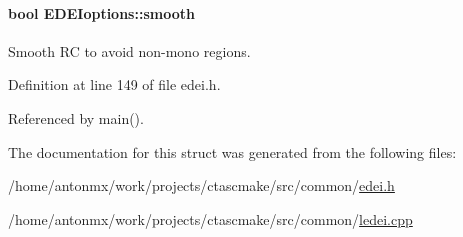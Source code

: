 \hypertarget{structEDEIoptions_a488f675984a6d3c72b6b8f70422f8c2f}{
\paragraph[{smooth}]{\setlength{\rightskip}{0pt plus 5cm}bool {\bf EDEIoptions::smooth}}\hfill}
\label{structEDEIoptions_a488f675984a6d3c72b6b8f70422f8c2f}


Smooth RC to avoid non-\/mono regions. 



Definition at line 149 of file edei.h.



Referenced by main().



The documentation for this struct was generated from the following files:\begin{DoxyCompactItemize}
\item 
/home/antonmx/work/projects/ctascmake/src/common/\hyperlink{edei_8h}{edei.h}\item 
/home/antonmx/work/projects/ctascmake/src/common/\hyperlink{ledei_8cpp}{ledei.cpp}\end{DoxyCompactItemize}
